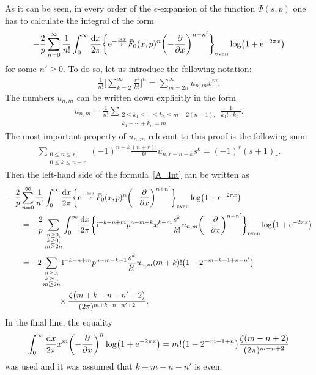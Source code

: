 \documentclass[pdftex]{sigma}
\numberwithin{equation}{section}
\begin{document}
As it can be seen, in every order of the $\epsilon$-expansion of the function $\Psi(s, p)$ one has to calculate the integral of the form
\begin{align}\label{A_Int}
-\frac{2}{p} \sum_{n=0}^{\infty} \frac{1}{n!} \int_{0}^{\infty} \frac{{\rm d}x}{2\pi} \biggl\{ {\rm e}^{-\frac{{\rm i}sx}{p}} \bar{F}_0(x, p)^n \biggl(-\frac{\partial}{\partial x}\biggr)^{n+n'} \biggr\}_{\text{even}} \log\bigl(1+{\rm e}^{-2\pi x}\bigr)
\end{align}
for some $n'\geq 0$. To do so, let us introduce the following notation:
\begin{align*}%
\frac{1}{n!}\Biggl[ \sum_{k=2}^{\infty} \frac{x^k}{k!} \Biggr]^n=
\sum_{m=2n}^{\infty} u_{n, m} x^m.
\end{align*}
The numbers $u_{n, m}$ can be written down explicitly in the form
\begin{align*}
u_{n, m}=\frac{1}{n!} \sum_{\substack{2\leq k_1 \leq\cdots\leq k_n \leq m-2(n-1), \\ k_1+\cdots+k_n=m}} \frac{1}{k_1! \cdots k_n!}.
\end{align*}
The most important property of $u_{n, m}$ relevant to this proof is the following sum:
\begin{align}\label{A_u_1}
\sum_{\substack{0 \leq n \leq r, \\ 0 \leq k \leq n+r}} (-1)^{n+k} \frac{(n+r)!}{k!} u_{n, r+n-k} s^k=(-1)^r (s+1)_r.
\end{align}
Then the left-hand side of the formula~\eqref{A_Int} can be written as
\begin{align}
&-\frac{2}{p} \sum_{n=0}^{\infty} \frac{1}{n!} \int_{0}^{\infty} \frac{{\rm d}x}{2\pi} \biggl\{ {\rm e}^{-\frac{{\rm i}sx}{p}} \bar{F}_0(x, p)^n \biggl(-\frac{\partial}{\partial x}\biggr)^{n+n'} \biggr\}_{\text{even}} \log\bigl(1+{\rm e}^{-2\pi x}\bigr)\nonumber\\
&\qquad{}=-\frac{2}{p} \sum_{\substack{n \geq 0, \\ k \geq 0, \\ m \geq 2n}} \int_{0}^{\infty} \frac{{\rm d}x}{2\pi}
    \biggl\{{\rm i}^{-k+n+m} p^{n-m-k} x^{k+m} \frac{s^k}{k!} u_{n, m} \biggl(-\frac{\partial}{\partial x}\biggr)^{n+n'} \biggr\}_{\text{even}} \log\bigl(1+{\rm e}^{-2\pi x}\bigr)\cr
&\qquad{} =-2\sum_{\substack{n \geq 0,\\ k \geq 0, \\ m \geq 2n}} {\rm i}^{-k+n+m} p^{n-m-k-1} \frac{s^k}{k!} u_{n, m} (m+k)! \bigl(1-2^{-m-k-1+n+n'}\bigr)\nonumber\\
&\qquad\hphantom{=-2\sum_{\substack{n \geq 0,\\ k \geq 0, \\ m \geq 2n}}}{}
\times\frac{\zeta\bigl(m+k-n-n'+2\bigr)}{(2\pi)^{m+k-n-n'+2}}.\label{A_2}
\end{align}
In the final line, the equality
\begin{align*}
\int_{0}^{\infty} \frac{{\rm d}x}{2\pi} x^{m} \biggl(-\frac{\partial}{\partial x}\biggr)^n \log\bigl(1+{\rm e}^{-2\pi x}\bigr) = m!\bigl(1-2^{-m-1+n}\bigr) \frac{\zeta(m-n+2)}{(2\pi)^{m-n+2}}
\end{align*}
was used and it was assumed that $k+m-n-n'$ is even.
\end{document}
